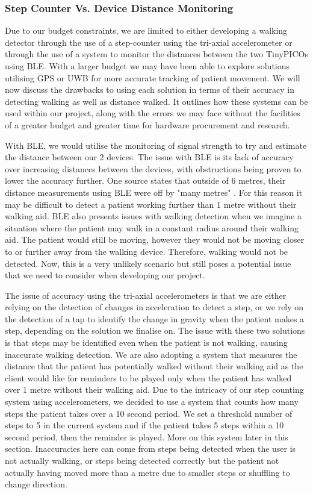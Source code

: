 {\subsubsection{Step Counter Vs. Device Distance Monitoring}

Due to our budget constraints, we are limited to either developing a walking detector through the use of a step-counter using the tri-axial accelerometer or through the use of a system to monitor the distances between the two TinyPICOs using BLE. With a larger budget we may have been able to explore solutions utilising GPS or UWB for more accurate tracking of patient movement. We will now discuss the drawbacks to using each solution in terms of their accuracy in detecting walking as well as distance walked. It outlines how these systems can be used within our project, along with the errors we may face without the facilities of a greater budget and greater time for hardware procurement and research.

With BLE, we would utilise the monitoring of signal strength to try and estimate the distance between our 2 devices. The issue with BLE is its lack of accuracy over increasing distances between the devices, with obstructions being proven to lower the accuracy further. One source states that outside of 6 metres, their distance measurements using BLE were off by "many metres" \cite{locatify_2020}. For this reason it may be difficult to detect a patient working further than 1 metre without their walking aid. BLE also presents issues with walking detection when we imagine a situation where the patient may walk in a constant radius around their walking aid. The patient would still be moving, however they would not be moving closer to or further away from the walking device. Therefore, walking would not be detected. Now, this is a very unlikely scenario but still poses a potential issue that we need to consider when developing our project.

The issue of accuracy using the tri-axial accelerometers is that we are either relying on the detection of changes in acceleration to detect a step, or we rely on the detection of a tap to identify the change in gravity when the patient makes a step, depending on the solution we finalise on. The issue with these two solutions is that steps may be identified even when the patient is not walking, causing inaccurate walking detection. We are also adopting a system that measures the distance that the patient has potentially walked without their walking aid as the client would like for reminders to be played only when the patient has walked over 1 metre without their walking aid. Due to the intricacy of our step counting system using accelerometers, we decided to use a system that counts how many steps the patient takes over a 10 second period. We set a threshold number of steps to 5 in the current system and if the patient takes 5 steps within a 10 second period, then the reminder is played. More on this system later in this section. Inaccuracies here can come from steps being detected when the user is not actually walking, or steps being detected correctly but the patient not actually having moved more than a metre due to smaller steps or shuffling to change direction.

}
